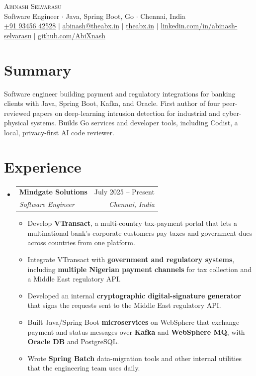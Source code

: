 \documentclass[letterpaper,11pt]{article}
\makeatletter
\newcommand{\resumeItem}[1]{\item\small{#1\vspace{-1.5pt}}}
\newcommand{\resumeSubheading}[4]{
  \vspace{-1pt}\item
    \begin{tabular*}{\linewidth}[t]{l@{\extracolsep{\fill}}r}
      \textbf{#1} & \small #2 \\
      \small\textit{#3} & \small\textit{#4} \\
    \end{tabular*}\vspace{-6pt}
}
\newcommand{\resumeListStart}{\begin{itemize}[leftmargin=0.15in, label={}]}
\newcommand{\resumeListEnd}{\end{itemize}}
\newcommand{\resumeItemListStart}{\begin{itemize}[leftmargin=0.18in, itemsep=0pt, topsep=2pt]}
\newcommand{\resumeItemListEnd}{\end{itemize}\vspace{-4pt}}
\makeatother
\begin{document}
\begin{center}
  {\Huge\scshape Abinash Selvarasu} \\ \vspace{3pt}
  \small Software Engineer $\cdot$ Java, Spring Boot, Go $\cdot$ Chennai, India \\ \vspace{2pt}
  \small
  \href{tel:+919345642528}{+91 93456 42528} $|$
  \href{mailto:abinash@theabx.in}{abinash@theabx.in} $|$
  \href{https://theabx.in}{theabx.in} $|$
  \href{https://linkedin.com/in/abinash-selvarasu}{linkedin.com/in/abinash-selvarasu} $|$
  \href{https://github.com/AbiXnash}{github.com/AbiXnash}
\end{center}
\vspace{-6pt}

\section{Summary}
\small{Software engineer building payment and regulatory integrations for banking clients with Java, Spring Boot,
Kafka, and Oracle. First author of four peer-reviewed papers on deep-learning intrusion detection for industrial and
cyber-physical systems. Builds Go services and developer tools, including Codist, a local, privacy-first AI code
reviewer.}
\vspace{-2pt}

\section{Experience}
\resumeListStart
  \resumeSubheading
    {Mindgate Solutions}{July 2025 -- Present}
    {Software Engineer}{Chennai, India}
    \resumeItemListStart
      \resumeItem{Develop \textbf{VTransact}, a multi-country tax-payment portal that lets a multinational bank's
        corporate customers pay taxes and government dues across countries from one platform.}
      \resumeItem{Integrate VTransact with \textbf{government and regulatory systems}, including \textbf{multiple
        Nigerian payment channels} for tax collection and a Middle East regulatory API.}
      \resumeItem{Developed an internal \textbf{cryptographic digital-signature generator} that signs the requests
        sent to the Middle East regulatory API.}
      \resumeItem{Built Java/Spring Boot \textbf{microservices} on WebSphere that exchange payment and status messages
        over \textbf{Kafka} and \textbf{WebSphere MQ}, with \textbf{Oracle DB} and PostgreSQL.}
      \resumeItem{Wrote \textbf{Spring Batch} data-migration tools and other internal utilities that the engineering
        team uses daily.}
    \resumeItemListEnd
\resumeListEnd
\end{document}
